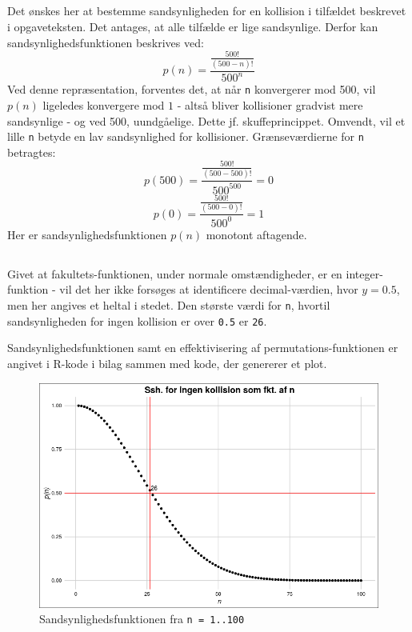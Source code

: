 \documentclass[a4paper,10pt]{article}
\begin{document}
\subsection{}
Det ønskes her at bestemme sandsynligheden for en kollision i tilfældet beskrevet i opgaveteksten. Det antages, at alle tilfælde er lige sandsynlige. Derfor kan sandsynlighedsfunktionen beskrives ved:
$$
p(n) = \frac{\frac{500!}{(500-n)!}}{500^n}
$$
Ved denne repræsentation, forventes det, at når \texttt{n} konvergerer mod 500, vil $p(n)$ ligeledes konvergere mod $1$ - altså bliver kollisioner gradvist mere sandsynlige - og ved 500, uundgåelige. Dette jf. skuffeprincippet. Omvendt, vil et lille \texttt{n} betyde en lav sandsynlighed for kollisioner. 
Grænseværdierne for \texttt{n} betragtes:
$$
p(500) = \frac{\frac{500!}{(500-500)!}}{500^{500}} = 0
$$
$$
p(0) = \frac{\frac{500!}{(500-0)!}}{500^0} = 1
$$
Her er sandsynlighedsfunktionen $p(n)$ monotont aftagende.

\newpage

\subsection{}
Givet at fakultets-funktionen, under normale omstændigheder, er en integer-funktion - vil det her ikke forsøges at identificere decimal-værdien, hvor $y = 0.5$, men her angives et heltal i stedet. Den største værdi for \texttt{n}, hvortil sandsynligheden for ingen kollision er over \texttt{0.5} er \texttt{26}.

Sandsynlighedsfunktionen samt en effektivisering af permutations-funktionen er angivet i R-kode i bilag sammen med kode, der genererer et plot. 

\begin{figure}[H]
\centering
\caption{Sandsynlighedsfunktionen fra \texttt{n = 1..100}}
\includegraphics[scale = 0.45]{plot.png}
\end{figure}
\end{document}
